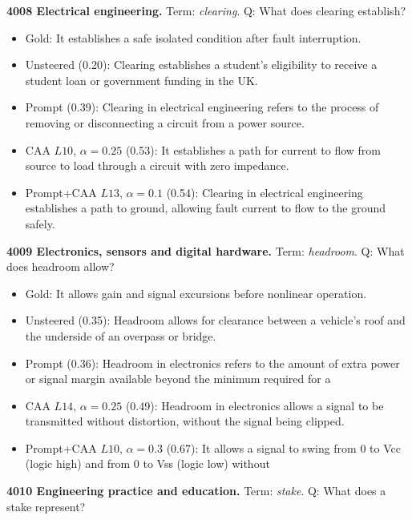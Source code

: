 \medskip\noindent\textbf{4008 Electrical engineering.} Term: \emph{clearing}.
Q: What does clearing establish?
\begin{itemize}\setlength{\itemsep}{0.15em}\setlength{\parsep}{0pt}\setlength{\topsep}{0.2em}
\item Gold: It establishes a safe isolated condition after fault interruption.
\item Unsteered (0.20): Clearing establishes a student's eligibility to receive a student loan or government funding in the UK.
\item Prompt (0.39): Clearing in electrical engineering refers to the process of removing or disconnecting a circuit from a power source.
\item CAA $L10$, $\alpha=0.25$ (0.53): It establishes a path for current to flow from source to load through a circuit with zero impedance.
\item Prompt+CAA $L13$, $\alpha=0.1$ (0.54): Clearing in electrical engineering establishes a path to ground, allowing fault current to flow to the ground safely.
\end{itemize}
\medskip\noindent\textbf{4009 Electronics, sensors and digital hardware.} Term: \emph{headroom}.
Q: What does headroom allow?
\begin{itemize}\setlength{\itemsep}{0.15em}\setlength{\parsep}{0pt}\setlength{\topsep}{0.2em}
\item Gold: It allows gain and signal excursions before nonlinear operation.
\item Unsteered (0.35): Headroom allows for clearance between a vehicle's roof and the underside of an overpass or bridge.
\item Prompt (0.36): Headroom in electronics refers to the amount of extra power or signal margin available beyond the minimum required for a
\item CAA $L14$, $\alpha=0.25$ (0.49): Headroom in electronics allows a signal to be transmitted without distortion, without the signal being clipped.
\item Prompt+CAA $L10$, $\alpha=0.3$ (0.67): It allows a signal to swing from 0 to Vcc (logic high) and from 0 to Vss (logic low) without
\end{itemize}
\medskip\noindent\textbf{4010 Engineering practice and education.} Term: \emph{stake}.
Q: What does a stake represent?
